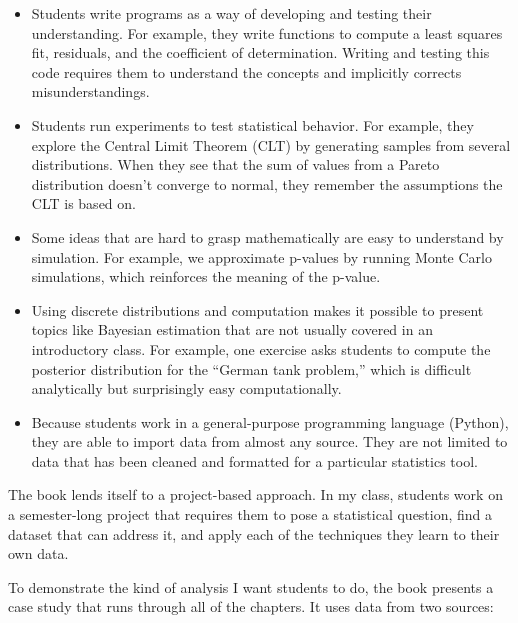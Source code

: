 \documentclass[12pt]{book}
\begin{document}
\begin{itemize}

\item Students write programs as a way of developing and testing their
  understanding.  For example, they write functions to compute a least
  squares fit, residuals, and the coefficient of determination.
  Writing and testing this code requires them to understand the
  concepts and implicitly corrects misunderstandings.

\item Students run experiments to test statistical behavior.  For
  example, they explore the Central Limit Theorem (CLT) by generating
  samples from several distributions.  When they see that the sum of
  values from a Pareto distribution doesn't converge to normal, they
  remember the assumptions the CLT is based on.

\item Some ideas that are hard to grasp mathematically are easy to
  understand by simulation.  For example, we approximate p-values by
  running Monte Carlo simulations, which reinforces the meaning of the
  p-value.

\item Using discrete distributions and computation makes it possible
  to present topics like Bayesian estimation that are not usually
  covered in an introductory class.  For example, one exercise asks
  students to compute the posterior distribution for the ``German tank
  problem,'' which is difficult analytically but surprisingly easy
  computationally.

\item Because students work in a general-purpose programming language
  (Python), they are able to import data from almost any
  source.  They are not limited to data that has been cleaned and
  formatted for a particular statistics tool.

\end{itemize}

The book lends itself to a project-based approach.  In my class, students
work on a semester-long project that requires them to pose a statistical
question, find a dataset that can address it, and apply each of the
techniques they learn to their own data.

To demonstrate the kind of analysis I want students to do,
the book presents a case study that runs through all of the chapters.
It uses data from two sources:
\end{document}
